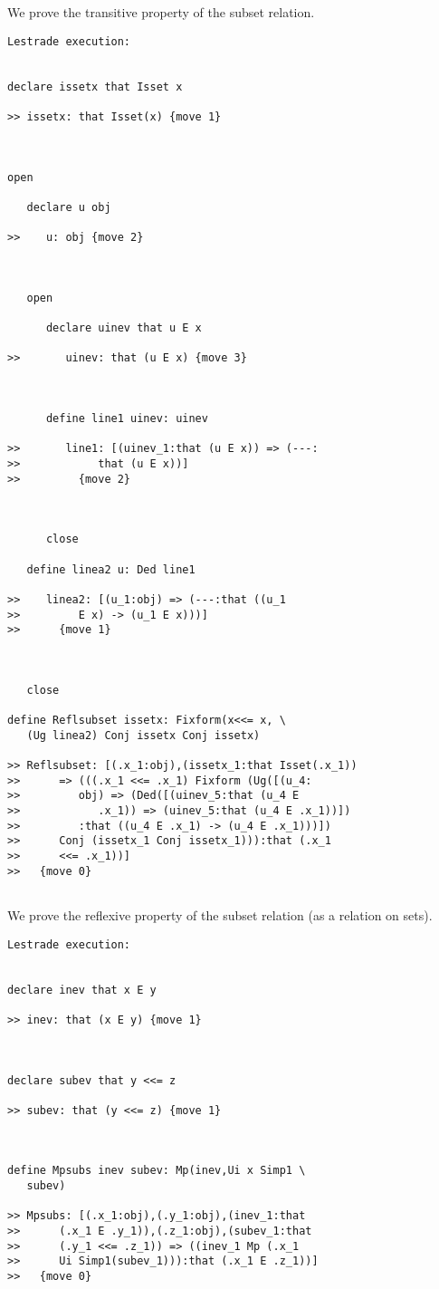 \documentclass[12pt]{article}
\begin{document}
We prove the transitive property of the subset relation.

\begin{verbatim}Lestrade execution:


declare issetx that Isset x

>> issetx: that Isset(x) {move 1}



open

   declare u obj

>>    u: obj {move 2}



   open

      declare uinev that u E x

>>       uinev: that (u E x) {move 3}



      define line1 uinev: uinev

>>       line1: [(uinev_1:that (u E x)) => (---:
>>            that (u E x))]
>>         {move 2}



      close

   define linea2 u: Ded line1

>>    linea2: [(u_1:obj) => (---:that ((u_1
>>         E x) -> (u_1 E x)))]
>>      {move 1}



   close

define Reflsubset issetx: Fixform(x<<= x, \
   (Ug linea2) Conj issetx Conj issetx)

>> Reflsubset: [(.x_1:obj),(issetx_1:that Isset(.x_1))
>>      => (((.x_1 <<= .x_1) Fixform (Ug([(u_4:
>>         obj) => (Ded([(uinev_5:that (u_4 E
>>            .x_1)) => (uinev_5:that (u_4 E .x_1))])
>>         :that ((u_4 E .x_1) -> (u_4 E .x_1)))])
>>      Conj (issetx_1 Conj issetx_1))):that (.x_1
>>      <<= .x_1))]
>>   {move 0}


\end{verbatim}

We prove the reflexive property of the subset relation (as a relation on sets).

\begin{verbatim}Lestrade execution:


declare inev that x E y

>> inev: that (x E y) {move 1}



declare subev that y <<= z

>> subev: that (y <<= z) {move 1}



define Mpsubs inev subev: Mp(inev,Ui x Simp1 \
   subev)

>> Mpsubs: [(.x_1:obj),(.y_1:obj),(inev_1:that
>>      (.x_1 E .y_1)),(.z_1:obj),(subev_1:that
>>      (.y_1 <<= .z_1)) => ((inev_1 Mp (.x_1
>>      Ui Simp1(subev_1))):that (.x_1 E .z_1))]
>>   {move 0}


\end{verbatim}
\end{document}
